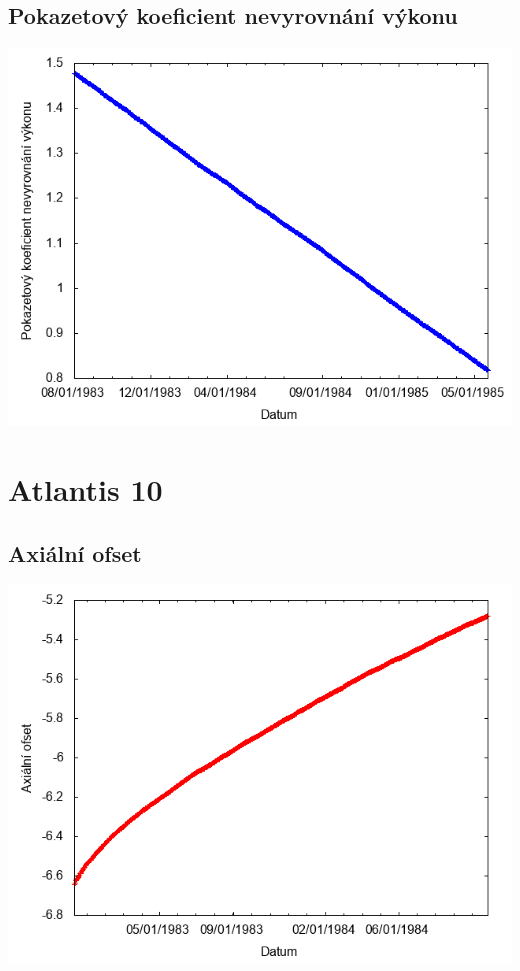 \documentclass[a4paper,twoside,11pt]{article}
\begin{document}
\subsection*{Pokazetový koeficient nevyrovnání výkonu}
\begin{center}
\includegraphics[width=.8\textwidth]{graphs/Atlantis_09_fha.png}
\end{center}

\newpage
\section*{Atlantis 10}
\subsection*{Axiální ofset}
\begin{center}
\includegraphics[width=.8\textwidth]{graphs/Atlantis_10_ao.png}
\end{center}
\end{document}
